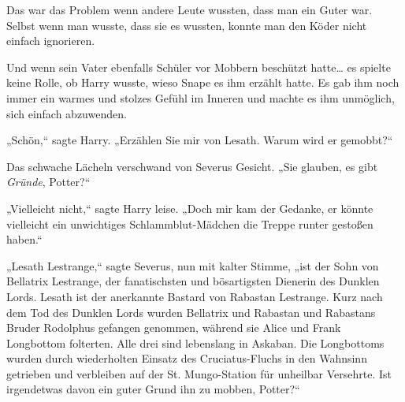 Das war das Problem wenn andere Leute wussten, dass man ein Guter war. Selbst wenn man wusste, dass sie es wussten, konnte man den Köder nicht einfach ignorieren.

Und wenn sein Vater ebenfalls Schüler vor Mobbern beschützt hatte… es spielte keine Rolle, ob Harry wusste, wieso Snape es ihm erzählt hatte. Es gab ihm noch immer ein warmes und stolzes Gefühl im Inneren und machte es ihm unmöglich, sich einfach abzuwenden.

„Schön,“ sagte Harry. „Erzählen Sie mir von Lesath. Warum wird er gemobbt?“

Das schwache Lächeln verschwand von Severus Gesicht. „Sie glauben, es gibt \emph{Gründe}, Potter?“

„Vielleicht nicht,“ sagte Harry leise. „Doch mir kam der Gedanke, er könnte vielleicht ein unwichtiges Schlammblut-Mädchen die Treppe runter gestoßen haben.“

„Lesath Lestrange,“ sagte Severus, nun mit kalter Stimme, „ist der Sohn von Bellatrix Lestrange, der fanatischsten und bösartigsten Dienerin des Dunklen Lords. Lesath ist der anerkannte Bastard von Rabastan Lestrange. Kurz nach dem Tod des Dunklen Lords wurden Bellatrix und Rabastan und Rabastans Bruder Rodolphus gefangen genommen, während sie Alice und Frank Longbottom folterten. Alle drei sind lebenslang in Askaban. Die Longbottoms wurden durch wiederholten Einsatz des Cruciatus-Fluchs in den Wahnsinn getrieben und verbleiben auf der St. Mungo-Station für unheilbar Versehrte. Ist irgendetwas davon ein guter Grund ihn zu mobben, Potter?“

